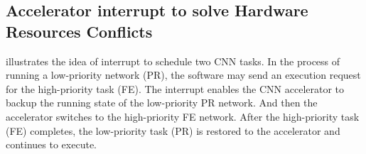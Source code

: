 

\subsection{ Accelerator interrupt to solve Hardware Resources Conflicts }



 illustrates the idea of interrupt to schedule two CNN tasks. In the process of running a low-priority network (PR), the software may send an execution request for the high-priority task (FE). The interrupt enables the CNN accelerator to backup the running state of the low-priority PR network. And then the accelerator switches to the high-priority FE network. After the high-priority task (FE) completes, the low-priority task (PR) is restored to the accelerator and continues to execute.



